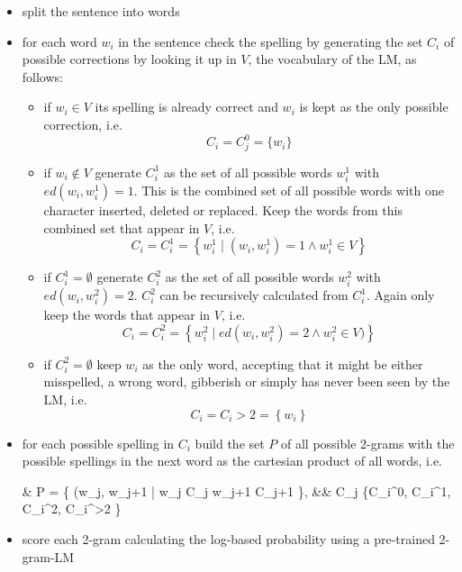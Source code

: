 \begin{itemize}
	\item split the sentence into words 
	\item for each word $w_i$ in the sentence check the spelling by generating the set $C_i$ of possible corrections by looking it up in $V$, the vocabulary of the \ac{LM}, as follows:
	\begin{itemize}
		\item if $w_i \in V$ its spelling is already correct and $w_i$ is kept as the only possible correction, i.e.
		\begin{equation*}
			C_i = C_j^0 = \{ w_i \}
		\end{equation*}
		\item if $w_i \not\in V$ generate $C_i^1$ as the set of all possible words $w_i^1$ with $ed(w_i, w_i^1) = 1$. This is the combined set of all possible words with one character inserted, deleted or replaced. Keep the words from this combined set that appear in $V$, i.e.
		\begin{equation*}
			C_i = C_i^1 = \left \{ w_i^1 \mid (w_i, w_i^1) = 1 \land w_i^1 \in V \right \}
		\end{equation*}
		\item if $C_i^1 = \emptyset$ generate $C_i^2$ as the set of all possible words $w_i^2$ with $ed(w_i, w_i^2) = 2$. $C_i^2$ can be recursively calculated from $C_i^1$. Again only keep the words that appear in $V$, i.e.
		\begin{equation*}
			C_i = C_i^2 = \left \{ w_i^2 \mid ed(w_i, w_i^2) = 2 \land w_i^2 \in V) \right \}
		\end{equation*}
		\item if $C_i^2 = \emptyset$ keep $w_i$ as the only word, accepting that it might be either misspelled, a wrong word, gibberish or simply has never been seen by the \ac{LM}, i.e.
		\begin{equation*}
			C_i = C_i{>2} = \left \{ w_i  \right \}
		\end{equation*}
	\end{itemize}
	\item for each possible spelling in $C_i$ build the set $P$ of all possible 2-grams with the possible spellings in the next word as the cartesian product of all words, i.e.
	\begin{flalign*}
&	P = \{ (w_j, w_{j+1} | w_j \in C_j \land w_{j+1} \in C_{j+1} \}{,} && C_j \in \{C_i^0, C_i^1, C_i^2, C_i^{>2} \}
	\end{flalign*}
	\item score each 2-gram calculating the log-based probability using a pre-trained 2-gram-\ac{LM}
\end{itemize}

